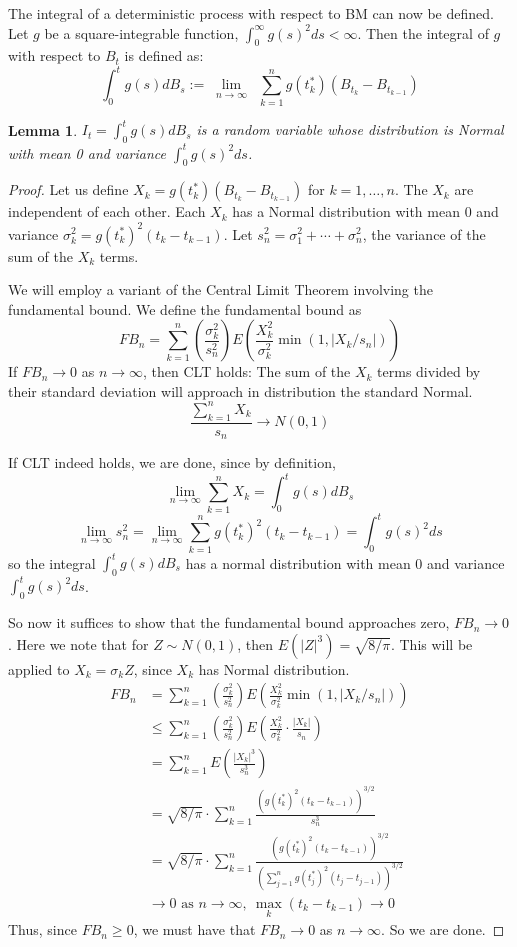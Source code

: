 \documentclass{article}
\newtheorem{lemma}[theorem]{Lemma}
\begin{document}
The integral of a deterministic process with respect to BM can now be defined.  Let $g$ be a square-integrable function, $\int_0^\infty g(s)^2ds < \infty$.  Then the integral of $g$ with respect to $B_t$ is defined as: 
$$\int_0^t g(s)dB_s := 
\lim_{\substack{n\to\infty }}\ 
\sum_{k=1}^n g(t_k^*)(B_{t_k} - B_{t_{k-1}})$$ 

\begin{lemma}
$I_t = \int_0^t g(s) dB_s$ is a random variable whose distribution is Normal with mean 0 and variance $\int_0^t g(s)^2 ds$.
\end{lemma}
\begin{proof}
Let us define $X_k = g(t_k^*)(B_{t_k} - B_{t_{k-1}})$ for $k=1,\ldots,n$.  The $X_k$ are independent of each other.  Each $X_k$ has a Normal distribution with mean 0 and variance $\sigma_k^2 = g(t_k^*)^2(t_k-t_{k-1})$.  Let $s_n^2 = \sigma_1^2 + \cdots + \sigma_n^2$, the variance of the sum of the $X_k$ terms.  

We will employ a variant of the Central Limit Theorem involving the fundamental bound.  We define the fundamental bound as 
$$FB_n = \sum_{k=1}^n \left(\frac{\sigma_k^2}{s_n^2}\right) E\left(\frac{X_k^2}{\sigma_k^2}\min(1, |X_k / s_n|)\right)$$
If $FB_n \to 0$ as $n\to\infty$, then CLT holds: The sum of the $X_k$ terms divided by their standard deviation will approach in distribution the standard Normal.
$$ \frac{\sum_{k=1}^n X_k}{s_n} \to N(0,1)$$  

If CLT indeed holds, we are done, since by definition, 
$$\lim_{n\to\infty} \sum_{k=1}^n X_k = \int_0^t g(s)dB_s$$
$$\lim_{n\to\infty} s_n^2 = \lim_{n\to\infty} \sum_{k=1}^n g(t_k^*)^2(t_k - t_{k-1}) = \int_0^t g(s)^2ds$$
so the integral $\int_0^t g(s)dB_s$ has a normal distribution with mean 0 and variance $\int_0^t g(s)^2ds$.

So now it suffices to show that the fundamental bound approaches zero, $FB_n \to 0$.  Here we note that for $Z\sim N(0,1)$, then $E(|Z|^3) = \sqrt{8/\pi}$.  This will be applied to $X_k = \sigma_k Z$, since $X_k$ has Normal distribution.
\begin{align*}
FB_n &= \sum_{k=1}^n \left(\frac{\sigma_k^2}{s_n^2}\right) E\left(\frac{X_k^2}{\sigma_k^2}\min(1, |X_k / s_n|)\right) \\
&\leq \sum_{k=1}^n \left(\frac{\sigma_k^2}{s_n^2}\right) E\left(\frac{X_k^2}{\sigma_k^2}\cdot \frac{|X_k|}{s_n}\right) \\
&= \sum_{k=1}^n E\left( \frac{|X_k|^3}{s_n^3}\right) \\
&= \sqrt{8/\pi}\cdot\sum_{k=1}^n \frac{(g(t_k^*)^2(t_k-t_{k-1}))^{3/2}}{s_n^3} \\
&= \sqrt{8/\pi}\cdot\sum_{k=1}^n \frac{(g(t_k^*)^2(t_k-t_{k-1}))^{3/2}}
{\left( \sum_{j=1}^n g(t_j^*)^2(t_j - t_{j-1}) \right)^{3/2}} \\
&\to 0 \text{ as } n\to\infty,\ \max_k(t_k-t_{k-1}) \to 0
\end{align*}
Thus, since $FB_n\geq 0$, we must have that $FB_n \to 0$ as $n\to\infty$.  So we are done.

\end{proof}
\end{document}
